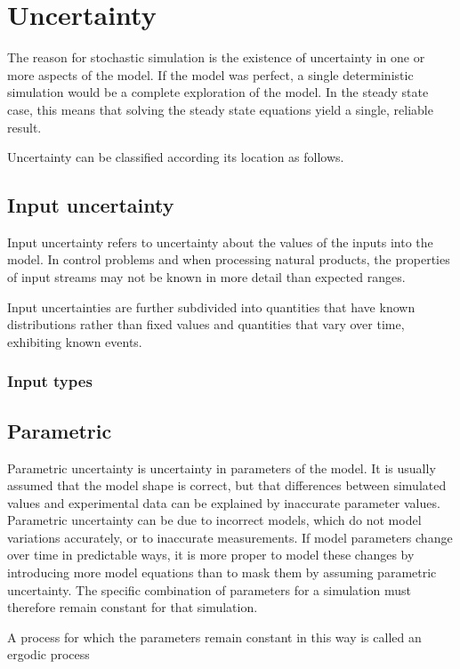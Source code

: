 \section{Uncertainty}
The reason for stochastic simulation is the existence of uncertainty in
one or more aspects of the model.  If the model was perfect, a single
deterministic simulation would be a complete exploration of the
model.  In the steady state case, this means that solving the steady
state equations yield a single, reliable result.  

Uncertainty can be classified according its location as follows.

\subsection{Input uncertainty}
Input uncertainty refers to uncertainty about the values of the inputs
into the model.  In control problems and when processing natural
products, the properties of input streams may not be known in more
detail than expected ranges.

Input uncertainties are further subdivided into quantities that have
known distributions rather than fixed values and quantities that vary
over time, exhibiting known events.

\subsubsection{Input types}

\subsection{Parametric}
Parametric uncertainty is uncertainty in parameters of the model.  It
is usually assumed that the model shape is correct, but that
differences between simulated values and experimental data can be
explained by inaccurate parameter values.  Parametric uncertainty can
be due to incorrect models, which do not model variations accurately,
or to inaccurate measurements.  If model parameters change over time
in predictable ways, it is more proper to model these changes by
introducing more model equations than to mask them by assuming
parametric uncertainty.  The specific combination of parameters for a
simulation must therefore remain constant for that simulation.

A process for which the parameters remain constant in this way is
called an ergodic process

